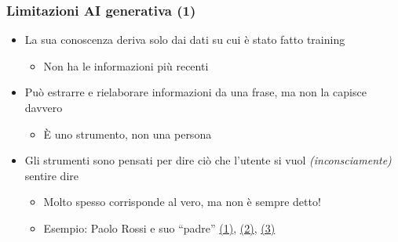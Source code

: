 
\begin{contentframe}
    \frametitle{Limitazioni AI generativa (1)}

    \begin{itemize}
        \item La sua conoscenza deriva solo dai dati su cui è stato fatto training
        \begin{itemize}
            \item Non ha le informazioni più recenti
        \end{itemize}
        
        \bigskip
        \item Può estrarre e rielaborare informazioni da una frase, ma non la capisce davvero
        \begin{itemize}
            \item È uno strumento, non una persona
        \end{itemize}
        
        \bigskip
        \item Gli strumenti sono pensati per dire ciò che l'utente si vuol \textit{(inconsciamente)} sentire dire
        \begin{itemize}
            \item Molto spesso corrisponde al vero, ma non è sempre detto!
            \item Esempio: Paolo Rossi e suo ``padre'' \href{https://chatgpt.com/share/6788f77b-4758-8003-84ec-12aefa6654a0}{(1)}, \href{https://chatgpt.com/share/6788f901-f5a4-8003-8001-8f26228454e3}{(2)}, \href{https://chatgpt.com/share/679892a1-cae4-8003-a0f0-aa8c36fd2d0d}{(3)}
        \end{itemize}
    \end{itemize}
\end{contentframe}

